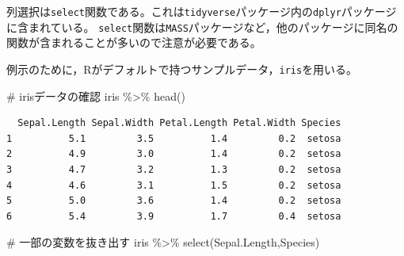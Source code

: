 \documentclass[
  a4paper,
]{ltjsbook}
\newenvironment{Shaded}{\begin{snugshade}}{\end{snugshade}}
\newcommand{\CommentTok}[1]{\textcolor[rgb]{0.37,0.37,0.37}{#1}}
\newcommand{\FunctionTok}[1]{\textcolor[rgb]{0.28,0.35,0.67}{#1}}
\newcommand{\NormalTok}[1]{\textcolor[rgb]{0.00,0.23,0.31}{#1}}
\newcommand{\SpecialCharTok}[1]{\textcolor[rgb]{0.37,0.37,0.37}{#1}}
\begin{document}
列選択は\texttt{select}関数である。これは\texttt{tidyverse}パッケージ内の\texttt{dplyr}パッケージに含まれている。
\texttt{select}関数は\texttt{MASS}パッケージなど，他のパッケージに同名の関数が含まれることが多いので注意が必要である。

例示のために，Rがデフォルトで持つサンプルデータ，\texttt{iris}を用いる。

\begin{Shaded}
\begin{Highlighting}[]
\CommentTok{\# irisデータの確認}
\NormalTok{iris }\SpecialCharTok{\%\textgreater{}\%} \FunctionTok{head}\NormalTok{()}
\end{Highlighting}
\end{Shaded}

\begin{verbatim}
  Sepal.Length Sepal.Width Petal.Length Petal.Width Species
1          5.1         3.5          1.4         0.2  setosa
2          4.9         3.0          1.4         0.2  setosa
3          4.7         3.2          1.3         0.2  setosa
4          4.6         3.1          1.5         0.2  setosa
5          5.0         3.6          1.4         0.2  setosa
6          5.4         3.9          1.7         0.4  setosa
\end{verbatim}

\begin{Shaded}
\begin{Highlighting}[]
\CommentTok{\# 一部の変数を抜き出す}
\NormalTok{iris }\SpecialCharTok{\%\textgreater{}\%} \FunctionTok{select}\NormalTok{(Sepal.Length,Species)}
\end{Highlighting}
\end{Shaded}
\end{document}
